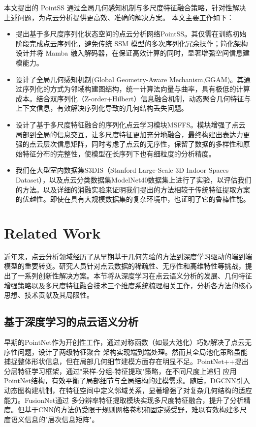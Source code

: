 \documentclass[preprint,12pt]{elsarticle}
\begin{document}
本文提出的 PointSS 通过全局几何感知机制与多尺度特征融合策略，针对性解决上述问题，为点云分析提供更高效、准确的解决方案。
本文主要工作如下：
\begin{itemize}
	\item 提出基于多尺度序列化状态空间的点云分析网络PointSS。其仅需在训练初始阶段完成点云序列化，避免传统 SSM 模型的多次序列化冗余操作；简化架构设计并将 Mamba 融入解码器，在保证高效计算的同时，显著增强空间信息建模能力。
	\item 设计了全局几何感知机制(Global Geometry-Aware Mechanism,GGAM)。其通过序列化的方式为邻域构建图结构，统一计算法向量与曲率，具有极低的计算成本。结合双序列化（Z-order+Hilbert）信息融合机制，动态聚合几何特征与上下文信息，有效解决序列化导致的几何结构丢失问题。
	\item 设计了基于多尺度特征融合的序列化点云学习模块MSFFS。模块增强了点云局部到全局的信息交互，让多尺度特征更加充分地融合，最终构建出表达力更强的点云层次信息矩阵，同时考虑了点云的无序性，保留了数据的多样性和原始特征分布的完整性，使模型在长序列下也有细粒度的分析精度。
	\item 我们在大型室内数据集S3DIS（Stanford Large-Scale 3D Indoor Spaces Dataset）\cite{s3dis}，以及点云分类数据集ModelNet40\cite{ModelNet40}数据集上进行了实验，以评估我们的方法。以及详细的消融实验来证明我们提出的方法相较于传统特征提取方案的优越性。即使在具有大规模数据集的复杂环境中，也证明了它的鲁棒性能。
\end{itemize}





\section{Related Work}
近年来，点云分析领域经历了从早期基于几何先验的方法到深度学习驱动的端到端模型的重要转变。研究人员针对点云数据的稀疏性、无序性和高维特性等挑战，提出了一系列创新性解决方案。本节将从深度学习在点云语义分析的发展、几何特征增强策略以及多尺度特征融合技术三个维度系统梳理相关工作，分析各方法的核心思想、技术贡献及其局限性。

\subsection{基于深度学习的点云语义分析}
早期的PointNet\cite{pointnet}作为开创性工作，通过对称函数（如最大池化）巧妙解决了点云无序性问题，设计了两级特征聚合
架构实现端到端处理。然而其全局池化策略虽能捕捉整体形状信息，但在局部几何细节建模方面存在明显不足。PointNet++\cite{PointNet++}提出分层特征学习框架，通过"采样-分组-特征提取"策略，在不同尺度上递归
应用PointNet结构，有效平衡了局部细节与全局结构的建模需求。随后，DGCNN\cite{DGCNN}引入动态图构建机制，在特征空间中定义邻域关系，显著增强了对复杂几何结构的适应能力。FusionNet\cite{FusionNet}通过
多分辨率特征提取模块实现多尺度特征融合，提升了分析精度。但基于CNN的方法仍受限于规则网格卷积和固定感受野，难以有效构建多尺度语义信息的"层次信息矩阵"。
\end{document}
